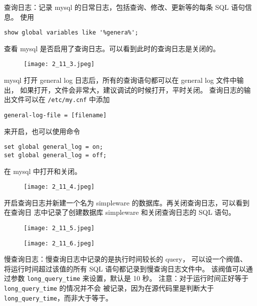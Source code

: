 查询日志：记录 mysql 的日常日志，包括查询、修改、更新等的每条 SQL 语句信息。
使用
\begin{verbatim}
show global variables like '%genera%';
\end{verbatim}
查看 mysql 是否启用了查询日志。可以看到此时的查询日志是关闭的。
\begin{figure}[H]
  \begin{center}
    \texttt{[image: 2\_11\_3.jpeg]}
  \end{center}
\end{figure}

mysql 打开 general log 日志后，所有的查询语句都可以在 general log 文件中输出，
如果打开，文件会非常大，建议调试的时候打开，平时关闭。
查询日志的输出文件可以在
\texttt{/etc/my.cnf} 中添加
\begin{verbatim}
general-log-file = [filename]
\end{verbatim}
来开启，也可以使用命令
\begin{verbatim}
set global general_log = on;
set global general_log = off;
\end{verbatim}
在 mysql 中打开和关闭。
\begin{figure}[H]
  \begin{center}
    \texttt{[image: 2\_11\_4.jpeg]}
  \end{center}
\end{figure}

开启查询日志并新建一个名为 simpleware 的数据库。再关闭查询日志，可以看到在查询日
志中记录了创建数据库 simpleware 和关闭查询日志的 SQL 语句。
\begin{figure}[H]
  \begin{center}
    \texttt{[image: 2\_11\_5.jpeg]}
  \end{center}
\end{figure}
\begin{figure}[H]
  \begin{center}
    \texttt{[image: 2\_11\_6.jpeg]}
  \end{center}
\end{figure}

慢查询日志：慢查询日志中记录的是执行时间较长的 query，
可以设一个阀值、将运行时间超过该值的所有 SQL 语句都记录到慢查询日志文件中。
该阀值可以通过参数 \texttt{long\_query\_time} 来设置，默认是 10 秒。
注意：对于运行时间正好等于 \texttt{long\_query\_time} 的情况并不会
被记录，因为在源代码里是判断大于 \texttt{long\_query\_time}，而非大于等于。

